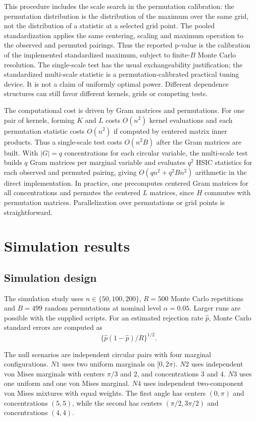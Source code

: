 \documentclass[11pt]{article}
\begin{document}
This procedure includes the scale search in the permutation calibration: the permutation distribution is the distribution of the maximum over the same grid, not the distribution of a statistic at a selected grid point.  The pooled standardization applies the same centering, scaling and maximum operation to the observed and permuted pairings.  Thus the reported p-value is the calibration of the implemented standardized maximum, subject to finite-\(B\) Monte Carlo resolution.  The single-scale test has the usual exchangeability justification; the standardized multi-scale statistic is a permutation-calibrated practical tuning device.  It is not a claim of uniformly optimal power.  Different dependence structures can still favor different kernels, grids or competing tests.

The computational cost is driven by Gram matrices and permutations.  For one pair of kernels, forming \(K\) and \(L\) costs \(O(n^2)\) kernel evaluations and each permutation statistic costs \(O(n^2)\) if computed by centered matrix inner products.  Thus a single-scale test costs \(O(n^2B)\) after the Gram matrices are built.  With \(|G|=q\) concentrations for each circular variable, the multi-scale test builds \(q\) Gram matrices per marginal variable and evaluates \(q^2\) HSIC statistics for each observed and permuted pairing, giving \(O(qn^2+q^2Bn^2)\) arithmetic in the direct implementation.  In practice, one precomputes centered Gram matrices for all concentrations and permutes the centered \(L\) matrices, since \(H\) commutes with permutation matrices.  Parallelization over permutations or grid points is straightforward.


\section{Simulation results}

\subsection{Simulation design}

The simulation study uses \(n\in\{50,100,200\}\), \(R=500\) Monte Carlo repetitions and \(B=499\) random permutations at nominal level \(\alpha=0.05\).  Larger runs are possible with the supplied scripts.  For an estimated rejection rate \(\widehat p\), Monte Carlo standard errors are computed as
\[
  \{\widehat p(1-\widehat p)/R\}^{1/2}.
\]

The null scenarios are independent circular pairs with four marginal configurations.  \(N1\) uses two uniform marginals on \([0,2\pi)\).  \(N2\) uses independent von Mises marginals with centers \(\pi/3\) and \(2\), and concentrations \(3\) and \(4\).  \(N3\) uses one uniform and one von Mises marginal.  \(N4\) uses independent two-component von Mises mixtures with equal weights.  The first angle has centers \((0,\pi)\) and concentrations \((5,5)\), while the second has centers \((\pi/2,3\pi/2)\) and concentrations \((4,4)\).
\end{document}
